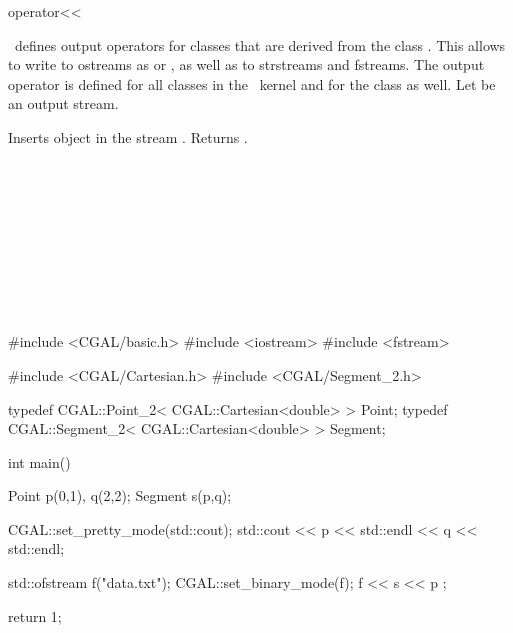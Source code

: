 

\begin{ccRefFunction}{operator<<}  %


\ccDefinition
\cgal\  defines output operators for classes that are derived
from the class . This allows to write to ostreams
as  or , as well as to strstreams
and fstreams. 
The output operator is defined for all classes in the \cgal\ kernel and for the class  as well.
Let   be an output stream.

{Inserts object  in the stream . Returns .}



\ccSeeAlso
{} \\
 \\
  \\
  \\
 \\
 \\
 \\
 \\

\ccExample
\begin{cprog}

#include <CGAL/basic.h>
#include <iostream>
#include <fstream>

#include <CGAL/Cartesian.h>
#include <CGAL/Segment_2.h>

typedef CGAL::Point_2< CGAL::Cartesian<double> >     Point;
typedef CGAL::Segment_2< CGAL::Cartesian<double> >   Segment;

int main()
{
    Point p(0,1), q(2,2);
    Segment s(p,q);

    CGAL::set_pretty_mode(std::cout);
    std::cout << p << std::endl << q  << std::endl;

    std::ofstream f("data.txt");
    CGAL::set_binary_mode(f);
    f << s << p ;

    return 1;
}
\end{cprog} 

\end{ccRefFunction}


